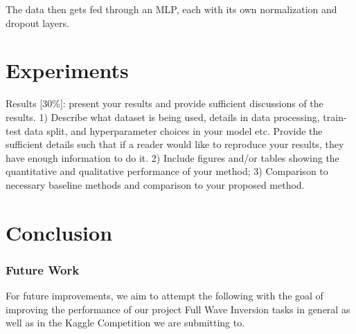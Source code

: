 \documentclass{article}
\newcommand{\instructions}[1]{{\color{blue} #1}}
\begin{document}
The data then gets fed through an MLP, each with its own normalization and dropout layers.


\section{Experiments}
\instructions{Results [30\%]: present your results and provide sufficient discussions of the results. 1) Describe what dataset is being used, details in data processing, train-test data split, and hyperparameter choices in your model etc. Provide the sufficient details such that if a reader would like to reproduce your results, they have enough information to do it. 2) Include figures and/or tables showing the quantitative and qualitative performance of your method; 3) Comparison to necessary baseline methods and comparison to your proposed method.} 

\section{Conclusion}

\subsubsection{Future Work}

For future improvements, we aim to attempt the following with the goal of improving the performance of our project Full Wave Inversion tasks in general as well as in the Kaggle Competition we are submitting to.
\end{document}
